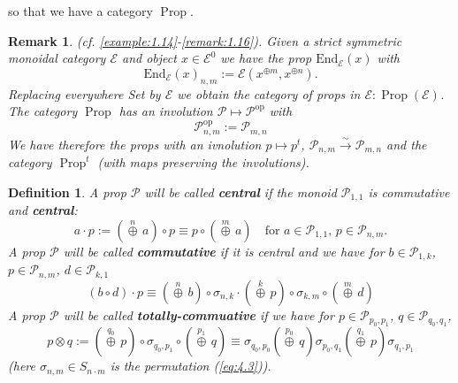 \documentclass[leqno]{article}
\newcommand{\myemph}[1]{{\it{\bf{#1}}}}
\newcommand{\E}{\mathcal{E}}
\newcommand{\biop}{\mathscr{P}}
\DeclareMathOperator{\prop}{Prop}
\newtheorem{definition}[equation]{Definition} %
\newtheorem{remark}[equation]{Remark}
\numberwithin{equation}{section}
\begin{document}
so that we have a category $\prop$. 
\begin{remark}
(cf. \ref{example:1.14}-\ref{remark:1.16}). Given a strict symmetric monoidal category
$\E$ and object $x\in\E^{0}$ we have the prop $\text{End}_{\E}(x)$ with 
\begin{equation}
				\text{End}_{\E}(x)_{n,m}:=\E(x^{\oplus m}, x^{\oplus n}). 
				\label{eq:10.13}
\end{equation}
Replacing everywhere Set by $\E$ we obtain the category of props in
$\E:\prop(\E)$. \\
The category $\prop$ has an involution $\biop\mapsto \biop^{\text{op}}$ with
\begin{equation}
				\biop^{\text{op}}_{n,m}:=\biop_{m,n}
  \label{eq:14}
\end{equation}
We have therefore the props with an ivnolution $p\mapsto p^{t}$,
$\biop_{n,m}\xrightarrow{\sim}\biop_{m,n}$ and the category $\prop^{t}$ (with maps
preserving the involutions). 
\label{remark:10.12}
\end{remark}
\begin{definition}
				A prop $\biop$ will be called \myemph{central} if the monoid $\biop_{1,1}$ is
				commutative and \myemph{central}:
				\begin{equation}
								a\cdot p := ( \overset{n}{\oplus}\, a)\circ p \equiv p\circ
								( \overset{m}{\oplus}\,a )\quad \text{for $a\in\biop_{1,1}$,
								$p\in\biop_{n,m}$}.
								\label{eq:10.16}
				\end{equation}
				A prop $\biop$ will be called \myemph{commutative} if it is central and we have
				for $b\in\biop_{1,k}$, $p\in\biop_{n,m} $, $d\in\biop_{k,1}$ 
				\begin{equation}
								(b\circ d)\cdot p \equiv ( \overset{n}{\oplus}\,b )\circ
								\sigma_{n,k}\cdot ( \overset{k}{\oplus}\,p )\circ
								\sigma_{k,m}\circ ( \overset{m}{\oplus}\, d )
								\label{eq:10.17}
				\end{equation}
				A prop $\biop$ will be called \myemph{totally-commuative} if we have for
				$p\in\biop_{p_0,p_1}$, \break $q\in\biop_{q_0,q_1}$, 
				\begin{equation}
								p\otimes q := (\overset{q_0}{\oplus}\, p)\circ \sigma_{q_0,p_1}\circ
                (\overset{p_1}{\oplus}\,q) \equiv \sigma_{q_0, p_0}(\overset{p_0}{\oplus}\,
								q)\sigma_{p_0,q_1}(\overset{q_1}{\oplus}\, p)\sigma_{q_1,p_1}
								\label{eq:10.18}
				\end{equation}
				(here $\sigma_{n,m}\in S_{n\cdot m}$ is the permutation (\ref{eq:4.3})). 
				\label{definition:10.15}
\end{definition}
\end{document}
